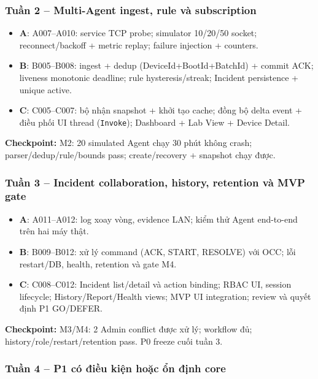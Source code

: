 \subsubsection*{Tuần 2 -- Multi-Agent ingest, rule và subscription}

\begin{itemize}
    \item \textbf{A}: A007--A010: service TCP probe; simulator 10/20/50 socket; reconnect/backoff + metric replay; failure injection + counters.
    \item \textbf{B}: B005--B008: ingest + dedup (DeviceId+BootId+BatchId) + commit ACK; liveness monotonic deadline; rule hysteresis/streak; Incident persistence + unique active.
    \item \textbf{C}: C005--C007: bộ nhận snapshot + khởi tạo cache; đồng bộ delta event + điều phối UI thread (\texttt{Invoke}); Dashboard + Lab View + Device Detail.
\end{itemize}

\textbf{Checkpoint:} M2: 20 simulated Agent chạy 30 phút không crash; parser/dedup/rule/bounds pass; create/recovery + snapshot chạy được.

\subsubsection*{Tuần 3 -- Incident collaboration, history, retention và MVP gate}

\begin{itemize}
    \item \textbf{A}: A011--A012: log xoay vòng, evidence LAN; kiểm thử Agent end-to-end trên hai máy thật.
    \item \textbf{B}: B009--B012: xử lý command (ACK, START, RESOLVE) với OCC; lỗi restart/DB, health, retention và gate M4.
    \item \textbf{C}: C008--C012: Incident list/detail và action binding; RBAC UI, session lifecycle; History/Report/Health views; MVP UI integration; review và quyết định P1 GO/DEFER.
\end{itemize}

\textbf{Checkpoint:} M3/M4: 2 Admin conflict được xử lý; workflow đủ; history/role/restart/retention pass. P0 freeze cuối tuần 3.

\subsubsection*{Tuần 4 -- P1 có điều kiện hoặc ổn định core}

